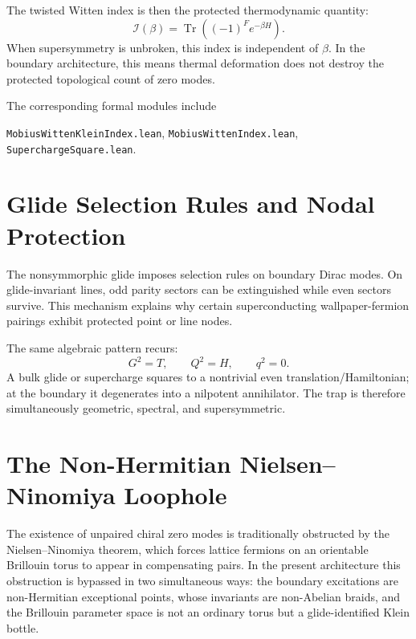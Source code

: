 The twisted Witten index is then the protected thermodynamic quantity:
\begin{equation}
    \mathcal{I}(\beta)=\operatorname{Tr}\left((-1)^F e^{-\beta H}\right).
\end{equation}
When supersymmetry is unbroken, this index is independent of $\beta$.  In the boundary architecture, this means thermal deformation does not destroy the protected topological count of zero modes.

The corresponding formal modules include
\begin{center}
\texttt{MobiusWittenKleinIndex.lean},\quad
\texttt{MobiusWittenIndex.lean},\quad
\texttt{SuperchargeSquare.lean}.
\end{center}

\section{Glide Selection Rules and Nodal Protection}

The nonsymmorphic glide imposes selection rules on boundary Dirac modes.  On glide-invariant lines, odd parity sectors can be extinguished while even sectors survive.  This mechanism explains why certain superconducting wallpaper-fermion pairings exhibit protected point or line nodes.

The same algebraic pattern recurs:
\begin{equation}
    G^2=T,
    \qquad
    Q^2=H,
    \qquad
    q^2=0.
\end{equation}
A bulk glide or supercharge squares to a nontrivial even translation/Hamiltonian; at the boundary it degenerates into a nilpotent annihilator.  The trap is therefore simultaneously geometric, spectral, and supersymmetric.

\section{The Non-Hermitian Nielsen--Ninomiya Loophole}

The existence of unpaired chiral zero modes is traditionally obstructed by the Nielsen--Ninomiya theorem, which forces lattice fermions on an orientable Brillouin torus to appear in compensating pairs.  In the present architecture this obstruction is bypassed in two simultaneous ways: the boundary excitations are non-Hermitian exceptional points, whose invariants are non-Abelian braids, and the Brillouin parameter space is not an ordinary torus but a glide-identified Klein bottle.

